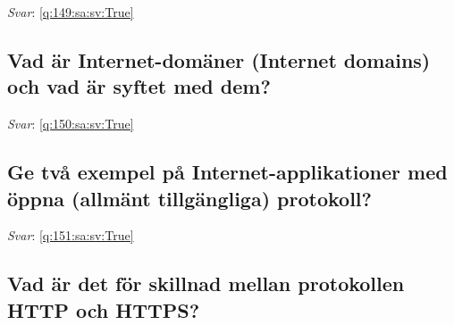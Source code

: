 \documentclass[a4paper,11pt,oneside]{article}
\begin{document}
\begin{sloppypar}
\label{q:149:sa:sv:False}

\vspace{2cm}

\noindent\makebox[\textwidth]{\hrulefill}

\vspace{1cm}

\textit{Svar}: \autoref{q:149:sa:sv:True}



\subsection{Vad \"ar Internet-dom\"aner (Internet domains) och vad \"ar syftet med dem?}

\label{q:150:sa:sv:False}

\vspace{2cm}

\noindent\makebox[\textwidth]{\hrulefill}

\vspace{1cm}

\textit{Svar}: \autoref{q:150:sa:sv:True}



\subsection{Ge tv\r{a} exempel p\r{a} Internet-applikationer med \"oppna (allm\"ant tillg\"angliga) protokoll?}

\label{q:151:sa:sv:False}

\vspace{2cm}

\noindent\makebox[\textwidth]{\hrulefill}

\vspace{1cm}

\textit{Svar}: \autoref{q:151:sa:sv:True}



\subsection{Vad \"ar det f\"or skillnad mellan protokollen HTTP och HTTPS?}

\label{q:152:sa:sv:False}

\vspace{2cm}

\noindent\makebox[\textwidth]{\hrulefill}

\vspace{1cm}


\end{sloppypar}
\end{document}
